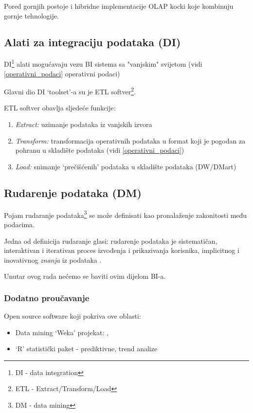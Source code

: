 \documentclass[times, utf8, seminar]{fit}
\begin{document}
Pored gornjih postoje i hibridne implementacije OLAP kocki koje kombinuju gornje tehnologije.

\subsection{Alati za integraciju podataka (DI)}

DI\footnote{DI - data integration} alati mogućavaju vezu BI sistema sa "vanjskim" svijetom (vidi \ref{operativni_podaci} operativni podaci)

Glavni dio DI `toolset'-a su je ETL softver\footnote{ETL - Extract/Transform/Load}. 

ETL softver obavlja sljedeće funkcije:

\begin{enumerate}
  \item \emph{Extract:}  uzimanje podataka iz vanjskih izvora
  \item \emph{Transform:} transformacija operativnih podataka u format koji je pogodan za pohranu u skladište podataka (vidi \ref{operativni_podaci})
  \item \emph{Load:} snimanje `prečišćenih' podataka u skladište podataka (DW/DMart)
\end{enumerate}
 
\subsection{Rudarenje podataka (DM)}

Pojam rudaranje podataka\footnote{DM - data mining} se može definisati kao pronalaženje zakonitosti među podacima. 

Jedna od definicija rudaranje glasi: rudarenje podataka je sistematičan, interaktivan i iterativan proces izvođenja i prikazivanja korisnika, implicitnog i inovativnog \emph{znanja} iz podataka \cite[str.~40]{mag_mrsic}.

Unutar ovog rada nećemo se baviti ovim dijelom BI-a.

\subsubsection {Dodatno proučavanje}

Open source software koji pokriva ove oblasti:
 
\begin{itemize}
  \item Data mining `Weka' projekat: \cite{web:weka}, \cite{web:pentaho_weka}
  \item `R' statistički paket \cite{web:r} - prediktivne, trend analize
\end{itemize}
\end{document}
